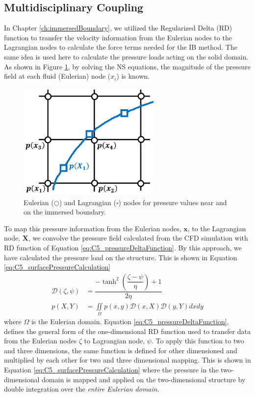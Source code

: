 \subsection{Multidisciplinary Coupling}
In Chapter \ref{ch:immersedBoundary}, we utilized the Regularized Delta (RD) function to transfer the velocity information from the Eulerian nodes to the Lagrangian nodes to calculate the force terms needed for the IB method. The same idea is used here to calculate the pressure loads acting on the solid domain. As shown in Figure \ref{fig:C5_pressureMapping}, by solving the NS equations, the magnitude of the pressure field at each fluid (Eulerian) node ($x_i$) is known.
%
\begin{figure}[H]
    \centering
    \includegraphics[width=7.00cm]{Chapter_5/figure/Chapter5_pressureMapping.jpg}
    \caption{Eulerian ($\bigcirc$) and Lagrangian ($\square$) nodes for pressure values near and on the immersed boundary.}
    \label{fig:C5_pressureMapping}
\end{figure}
%
To map this pressure information from the Eulerian nodes, $\mathbf{x}$, to the Lagrangian node, $\mathbf{X}$, we convolve the pressure field calculated from the CFD simulation with RD function of Equation \eqref{eq:C5_pressureDeltaFunction}.  By this approach, we have calculated the pressure load on the structure. This is shown in Equation \eqref{eq:C5_surfacePressureCalculation}
%
\begin{subequations}
\begin{align}
    \mathcal{D}(\zeta, \psi) &=
    \dfrac{-\tanh^{2}{\left (\dfrac{\zeta - \psi}{\eta} \right )} + 1}{2 \eta}
    \label{eq:C5_pressureDeltaFunction}
    \\
    p(X, Y) &= \iint\limits_{\Omega} p(x,y) \mathcal{D}(x, X) \mathcal{D}(y, Y) dx dy
    \label{eq:C5_surfacePressureCalculation}
\end{align}
\end{subequations}
%
where $\Omega$ is the Eulerian domain. Equation \eqref{eq:C5_pressureDeltaFunction}, defines the general form of the one-dimensional RD function used to transfer data from the Eulerian nodes $\zeta$ to Lagrangian node, $\psi$. To apply this function to two and three dimensions, the same function is defined for other dimensioned and multiplied by each other for two and three dimensional mapping. This is shown in Equation \eqref{eq:C5_surfacePressureCalculation} where the pressure in the two-dimensional domain is mapped and applied on the two-dimensional structure by double integration over the \emph{entire Eulerian domain}.

